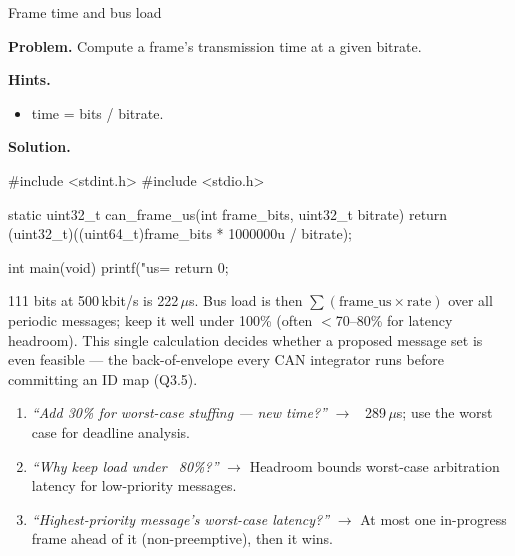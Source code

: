 \begin{gymproblem}{Frame time and bus load}

\textbf{Problem.} Compute a frame's transmission time at a given bitrate.

\textbf{Hints.}
\begin{itemize}
\item time = bits / bitrate.
\end{itemize}

\attempt

\textbf{Solution.}
\begin{cgym}
#include <stdint.h>
#include <stdio.h>

static uint32_t can_frame_us(int frame_bits, uint32_t bitrate) {
    return (uint32_t)((uint64_t)frame_bits * 1000000u / bitrate);
}

int main(void) {
    printf("us=%
    return 0;
}
\end{cgym}

111 bits at 500\,kbit/s is 222\,$\mu$s. Bus load is then
$\sum(\text{frame\_us} \times \text{rate})$ over all periodic messages; keep it
well under 100\% (often $<$70--80\% for latency headroom). This single
calculation decides whether a proposed message set is even feasible --- the
back-of-envelope every CAN integrator runs before committing an ID map
(Q3.5).

\followups
\begin{enumerate}
\item \emph{``Add 30\% for worst-case stuffing --- new time?''} $\rightarrow$
  ~289\,$\mu$s; use the worst case for deadline analysis.
\item \emph{``Why keep load under ~80\%?''} $\rightarrow$ Headroom bounds
  worst-case arbitration latency for low-priority messages.
\item \emph{``Highest-priority message's worst-case latency?''} $\rightarrow$
  At most one in-progress frame ahead of it (non-preemptive), then it wins.
\end{enumerate}
\end{gymproblem}

